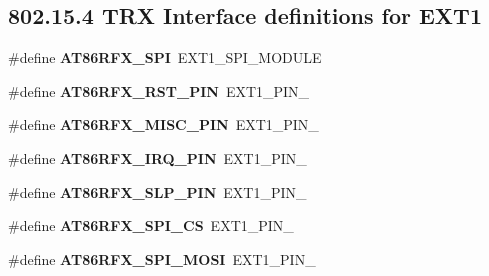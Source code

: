 \subsection*{802.15.4 T\+R\+X Interface definitions for E\+X\+T1}
\begin{DoxyCompactItemize}
\item 
\hypertarget{group__saml21__xplained__pro__features__group_gab3f9457f15a1d6c69e127b35f23b0ec8}{}\#define {\bfseries A\+T86\+R\+F\+X\+\_\+\+S\+P\+I}~E\+X\+T1\+\_\+\+S\+P\+I\+\_\+\+M\+O\+D\+U\+L\+E\label{group__saml21__xplained__pro__features__group_gab3f9457f15a1d6c69e127b35f23b0ec8}

\item 
\hypertarget{group__saml21__xplained__pro__features__group_ga278eab8315ffbdd5aa700e17609a3320}{}\#define {\bfseries A\+T86\+R\+F\+X\+\_\+\+R\+S\+T\+\_\+\+P\+I\+N}~E\+X\+T1\+\_\+\+P\+I\+N\+\_\label{group__saml21__xplained__pro__features__group_ga278eab8315ffbdd5aa700e17609a3320}

\item 
\hypertarget{group__saml21__xplained__pro__features__group_ga37c6c7515ae904b1b6e7f37c84fe03b9}{}\#define {\bfseries A\+T86\+R\+F\+X\+\_\+\+M\+I\+S\+C\+\_\+\+P\+I\+N}~E\+X\+T1\+\_\+\+P\+I\+N\+\_\label{group__saml21__xplained__pro__features__group_ga37c6c7515ae904b1b6e7f37c84fe03b9}

\item 
\hypertarget{group__saml21__xplained__pro__features__group_ga19b49c52c6f415a14360f0c811849629}{}\#define {\bfseries A\+T86\+R\+F\+X\+\_\+\+I\+R\+Q\+\_\+\+P\+I\+N}~E\+X\+T1\+\_\+\+P\+I\+N\+\_\label{group__saml21__xplained__pro__features__group_ga19b49c52c6f415a14360f0c811849629}

\item 
\hypertarget{group__saml21__xplained__pro__features__group_ga7173e3674298030d0dbc04edd71c52f5}{}\#define {\bfseries A\+T86\+R\+F\+X\+\_\+\+S\+L\+P\+\_\+\+P\+I\+N}~E\+X\+T1\+\_\+\+P\+I\+N\+\_\label{group__saml21__xplained__pro__features__group_ga7173e3674298030d0dbc04edd71c52f5}

\item 
\hypertarget{group__saml21__xplained__pro__features__group_ga52d465934b1bffbcad261c6a093bc4c6}{}\#define {\bfseries A\+T86\+R\+F\+X\+\_\+\+S\+P\+I\+\_\+\+C\+S}~E\+X\+T1\+\_\+\+P\+I\+N\+\_\label{group__saml21__xplained__pro__features__group_ga52d465934b1bffbcad261c6a093bc4c6}

\item 
\hypertarget{group__saml21__xplained__pro__features__group_ga8ab7848041b493dd995ab352d6152731}{}\#define {\bfseries A\+T86\+R\+F\+X\+\_\+\+S\+P\+I\+\_\+\+M\+O\+S\+I}~E\+X\+T1\+\_\+\+P\+I\+N\+\_\label{group__saml21__xplained__pro__features__group_ga8ab7848041b493dd995ab352d6152731}


\end{DoxyCompactItemize}
